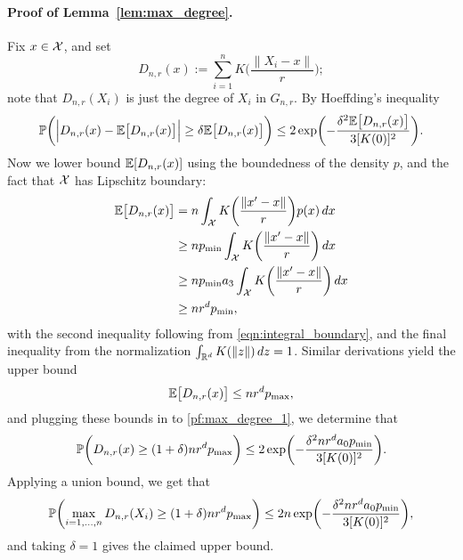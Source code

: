\paragraph{Proof of Lemma~\ref{lem:max_degree}.}
Fix $x \in \mathcal{X}$, and set
\begin{equation*}
D_{n,r}(x) :=  \sum_{i = 1}^{n} K\biggl(\frac{\|X_i - x\|}{r}\biggr);
\end{equation*}
note that $D_{n,r}(X_i)$ is just the degree of $X_i$ in $G_{n,r}$. By Hoeffding's inequality
\begin{equation}
\label{pf:max_degree_1}
\mathbb{P}\biggl(\Bigl|D_{n,r}(x) - \mathbb{E}\bigl[D_{n,r}(x)\bigr]\Bigr| \geq \delta \mathbb{E}\bigl[D_{n,r}(x)\bigr]\biggr) \leq 2\exp\biggl(-\frac{\delta^2\mathbb{E}\bigl[D_{n,r}(x)\bigr]}{3[K(0)]^2}\biggr).
\end{equation}
Now we lower bound $\mathbb{E}[D_{n,r}(x)]$ using the boundedness of the density $p$, and the fact that $\mathcal{X}$ has Lipschitz boundary:
\begin{align*}
\mathbb{E}\bigl[D_{n,r}(x)\bigr] & = n \int_{\mathcal{X}} K\biggl(\frac{\|x' - x\|}{r}\biggr) p(x) \,dx \\
& \geq n p_{\min} \int_{\mathcal{X}} K\biggl(\frac{\|x' - x\|}{r}\biggr) \,dx \\
& \geq n p_{\min} a_3 \int_{\mathcal{X}} K\biggl(\frac{\|x' - x\|}{r}\biggr) \,dx \\
& \geq nr^d p_{\min},
\end{align*}
with the second inequality following from \eqref{eqn:integral_boundary}, and the final inequality from the normalization $\int_{\mathbb{R}^d} K(\|z\|) \,dz = 1$. Similar derivations yield the upper bound
\begin{equation*}
\mathbb{E}\bigl[D_{n,r}(x)\bigr] \leq nr^{d} p_{\max},
\end{equation*} 
and plugging these bounds in to \eqref{pf:max_degree_1}, we determine that
\begin{equation*}
\mathbb{P}\biggl(D_{n,r}(x) \geq (1 + \delta) nr^d p_{\max}\biggr) \leq 2\exp\biggl(-\frac{\delta^2nr^da_0p_{\min}}{3[K(0)]^2}\biggr).
\end{equation*}
Applying a union bound, we get that
\begin{equation*}
\mathbb{P}\biggl(\max_{i = 1,\ldots,n}D_{n,r}(X_i) \geq (1 + \delta) nr^d p_{\max}\biggr) \leq 2n\exp\biggl(-\frac{\delta^2nr^da_0p_{\min}}{3[K(0)]^2}\biggr),
\end{equation*}
and taking $\delta = 1$ gives the claimed upper bound.
